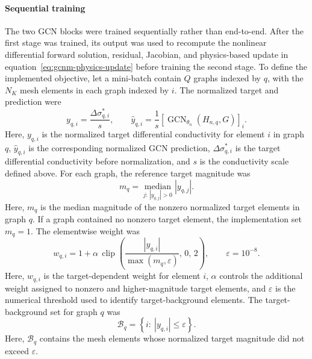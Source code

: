 \documentclass[11pt]{article}
\begin{document}
\paragraph{Sequential training}
\label{sec:gcnm-sequential-training}

The two GCN blocks were trained sequentially rather than end-to-end.
After the first stage was trained, its output was used to recompute the nonlinear differential forward solution, residual, Jacobian, and physics-based update in equation~\eqref{eq:gcnm-physics-update} before training the second stage.
To define the implemented objective, let a mini-batch contain $Q$ graphs indexed by $q$, with the $N_K$ mesh elements in each graph indexed by $i$.
The normalized target and prediction were
\begin{equation*}
    y_{q,i}
    =
    \frac{\Delta\sigma^{*}_{q,i}}{s},
    \qquad
    \widehat y_{q,i}
    =
    \frac{1}{s}
    \left[
        \operatorname{GCN}_{\theta_n}\!\left(H_{n,q},G\right)
    \right]_i.
\end{equation*}
Here, $y_{q,i}$ is the normalized target differential conductivity for element $i$ in graph $q$, $\widehat y_{q,i}$ is the corresponding normalized GCN prediction, $\Delta\sigma^{*}_{q,i}$ is the target differential conductivity before normalization, and $s$ is the conductivity scale defined above.
For each graph, the reference target magnitude was
\begin{equation*}
    m_q
    =
    \underset{j:\,|y_{q,j}|>0}{\operatorname{median}}
    |y_{q,j}|.
\end{equation*}
Here, $m_q$ is the median magnitude of the nonzero normalized target elements in graph $q$.
If a graph contained no nonzero target element, the implementation set $m_q=1$.
The elementwise weight was
\begin{equation*}
    w_{q,i}
    =
    1+\alpha\,
    \operatorname{clip}\!\left(
        \frac{|y_{q,i}|}{\max(m_q,\varepsilon)},\,0,\,2
    \right),
    \qquad
    \varepsilon=10^{-8}.
\end{equation*}
Here, $w_{q,i}$ is the target-dependent weight for element $i$, $\alpha$ controls the additional weight assigned to nonzero and higher-magnitude target elements, and $\varepsilon$ is the numerical threshold used to identify target-background elements.
The target-background set for graph $q$ was
\begin{equation*}
    \mathcal B_q
    =
    \left\{i:\ |y_{q,i}|\leq\varepsilon\right\}.
\end{equation*}
Here, $\mathcal B_q$ contains the mesh elements whose normalized target magnitude did not exceed $\varepsilon$.
\end{document}
